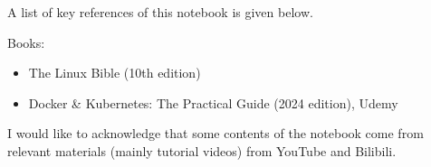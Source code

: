 A list of key references of this notebook is given below.

\noindent Books:
\begin{itemize}
	\item The Linux Bible (10th edition)
	\item Docker \& Kubernetes: The Practical Guide (2024 edition), Udemy
\end{itemize}

I would like to acknowledge that some contents of the notebook come from relevant materials (mainly tutorial videos) from YouTube and Bilibili.